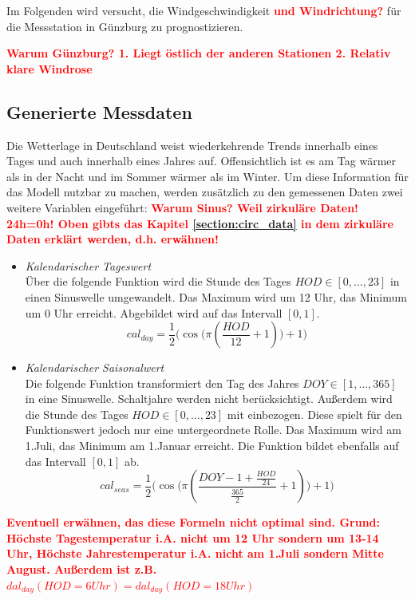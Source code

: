 \documentclass[
12pt, %
toc=listofnumbered, %
toc=chapterentrydotfill, %
numbers=noenddot, %
captions=tableheading, %
bibliography=numbered
]{scrreprt}
\let\Oldsubsection\subsection
\renewcommand{\subsection}{\FloatBarrier\Oldsubsection}
\newcommand{\highlight}[1]{\textbf{\textcolor{red}{#1}}}
\begin{document}
Im Folgenden wird versucht, die Windgeschwindigkeit \highlight{und Windrichtung?} für die Messstation in Günzburg zu prognostizieren. 

\highlight{Warum Günzburg? 1. Liegt östlich der anderen Stationen 2. Relativ klare Windrose}

\subsection{Generierte Messdaten}\label{section:gen_daten}
Die Wetterlage in Deutschland weist wiederkehrende Trends innerhalb eines Tages und auch innerhalb eines Jahres auf. Offensichtlich ist es am Tag wärmer als in der Nacht und im Sommer wärmer als im Winter. Um diese Information für das Modell nutzbar zu machen, werden zusätzlich zu den gemessenen Daten zwei weitere Variablen eingeführt: \highlight{Warum Sinus? Weil zirkuläre Daten! 24h=0h! Oben gibts das Kapitel \ref{section:circ_data} in dem zirkuläre Daten erklärt werden, d.h. erwähnen!}

\begin{itemize}
	\item \textit{Kalendarischer Tageswert}\\
	Über die folgende Funktion wird die Stunde des Tages $HOD \in [0, \dots, 23]$ in einen Sinuswelle umgewandelt. Das Maximum wird um 12 Uhr, das Minimum um 0 Uhr erreicht. Abgebildet wird auf das Intervall $[0,1]$.
	\begin{equation}\label{eq:cal_day}
		cal_{day} = \frac{1}{2}\Big(\cos \big(\pi (\frac{HOD}{12}+ 1)\big) + 1 \Big)
	\end{equation}
	\item \textit{Kalendarischer Saisonalwert}\\
	Die folgende Funktion transformiert den Tag des Jahres $DOY \in [1, \dots, 365]$ in eine Sinuswelle. Schaltjahre werden nicht berücksichtigt. Außerdem wird die Stunde des Tages $HOD \in [0, \dots, 23]$ mit einbezogen. Diese spielt für den Funktionswert jedoch nur eine untergeordnete Rolle. Das Maximum wird am 1.Juli, das Minimum am 1.Januar erreicht. Die Funktion bildet ebenfalls auf das Intervall $[0,1]$ ab.
	\begin{equation}\label{eq:cal_seas}
		cal_{seas} = \frac{1}{2}\Big(\cos\big(\pi (\frac{DOY -1 + \frac{HOD}{24}}{\frac{365}{2}}+ 1)\big) + 1\Big)
	\end{equation}
	
\end{itemize}

\highlight{Eventuell erwähnen, das diese Formeln nicht optimal sind. Grund: Höchste Tagestemperatur i.A. nicht um 12 Uhr sondern um 13-14 Uhr, Höchste Jahrestemperatur i.A. nicht am 1.Juli sondern Mitte August. Außerdem ist z.B. $dal_{day}(HOD=6Uhr) = dal_{day}(HOD=18Uhr)$}
\end{document}
